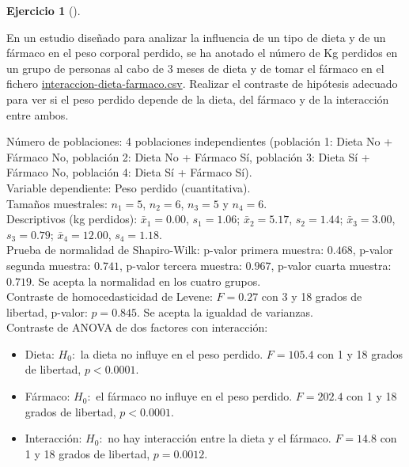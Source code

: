 \documentclass[
  spanish,
  a4paper,
]{scrreport}
\providecommand{\tightlist}{%
  \setlength{\itemsep}{0pt}\setlength{\parskip}{0pt}}
\theoremstyle{definition}
\newtheorem{exercise}{Ejercicio}[chapter]
\theoremstyle{remark}
\begin{document}
\begin{exercise}[]\protect\hypertarget{exr-contraste-anova-interaccion-dieta-farmaco}{}\label{exr-contraste-anova-interaccion-dieta-farmaco}

En un estudio diseñado para analizar la influencia de un tipo de dieta y
de un fármaco en el peso corporal perdido, se ha anotado el número de Kg
perdidos en un grupo de personas al cabo de 3 meses de dieta y de tomar
el fármaco en el fichero
\href{datos/interaccion-dieta-farmaco.csv}{interaccion-dieta-farmaco.csv}.
Realizar el contraste de hipótesis adecuado para ver si el peso perdido
depende de la dieta, del fármaco y de la interacción entre ambos.

\end{exercise}

\begin{tcolorbox}[enhanced jigsaw, arc=.35mm, bottomrule=.15mm, bottomtitle=1mm, breakable, colback=white, colbacktitle=quarto-callout-tip-color!10!white, colframe=quarto-callout-tip-color-frame, coltitle=black, left=2mm, leftrule=.75mm, opacityback=0, opacitybacktitle=0.6, rightrule=.15mm, title=\textcolor{quarto-callout-tip-color}{\faLightbulb}\hspace{0.5em}{Solución}, titlerule=0mm, toprule=.15mm, toptitle=1mm]

Número de poblaciones: 4 poblaciones independientes (población 1: Dieta
No + Fármaco No, población 2: Dieta No + Fármaco Sí, población 3: Dieta
Sí + Fármaco No, población 4: Dieta Sí + Fármaco Sí).\\
Variable dependiente: Peso perdido (cuantitativa).\\
Tamaños muestrales: \(n_1=5\), \(n_2=6\), \(n_3=5\) y \(n_4=6\).\\
Descriptivos (kg perdidos): \(\bar x_1=0.00\), \(s_1=1.06\);
\(\bar x_2=5.17\), \(s_2=1.44\); \(\bar x_3=3.00\), \(s_3=0.79\);
\(\bar x_4=12.00\), \(s_4=1.18\).\\
Prueba de normalidad de Shapiro-Wilk: p-valor primera muestra:
\(0.468\), p-valor segunda muestra: \(0.741\), p-valor tercera muestra:
\(0.967\), p-valor cuarta muestra: \(0.719\). Se acepta la normalidad en
los cuatro grupos.\\
Contraste de homocedasticidad de Levene: \(F=0.27\) con 3 y 18 grados de
libertad, p-valor: \(p=0.845\). Se acepta la igualdad de varianzas.\\
Contraste de ANOVA de dos factores con interacción:

\begin{itemize}
\tightlist
\item
  Dieta: \(H_0:\) la dieta no influye en el peso perdido. \(F=105.4\)
  con 1 y 18 grados de libertad, \(p<0.0001\).\\
\item
  Fármaco: \(H_0:\) el fármaco no influye en el peso perdido.
  \(F=202.4\) con 1 y 18 grados de libertad, \(p<0.0001\).\\
\item
  Interacción: \(H_0:\) no hay interacción entre la dieta y el fármaco.
  \(F=14.8\) con 1 y 18 grados de libertad, \(p=0.0012\).
\end{itemize}


\end{tcolorbox}
\end{document}
